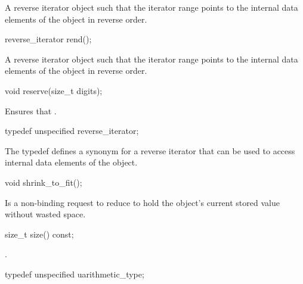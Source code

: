 \begin{itemdescr}
\returns A reverse iterator object such that the iterator range \tcode{[crbegin(), crend())} points to the internal data elements of the  object in reverse order.		
\end{itemdescr}

\begin{itemdecl}
reverse_iterator rend();		
\end{itemdecl}

\begin{itemdescr}
\returns A reverse iterator object such that the iterator range \tcode{[crbegin(), crend())} points to the internal data elements of the  object in reverse order.		
\end{itemdescr}

\begin{itemdecl}
void reserve(size_t digits);		
\end{itemdecl}

\begin{itemdescr}
\effects Ensures that .		
\end{itemdescr}

\begin{itemdecl}
typedef unspecified reverse_iterator;		
\end{itemdecl}

\begin{itemdescr}
The typedef defines a synonym for a reverse iterator that can be used to access internal data elements of the  object.		
\end{itemdescr}

\begin{itemdecl}
void shrink_to_fit();		
\end{itemdecl}

\begin{itemdescr}
\effect Is a non-binding request to reduce  to hold the  object's current stored value without wasted space.		
\end{itemdescr}

\begin{itemdecl}
size_t size() const;		
\end{itemdecl}

\begin{itemdescr}
\returns {}.		
\end{itemdescr}

\begin{itemdecl}
typedef unspecified uarithmetic_type;		
\end{itemdecl}


